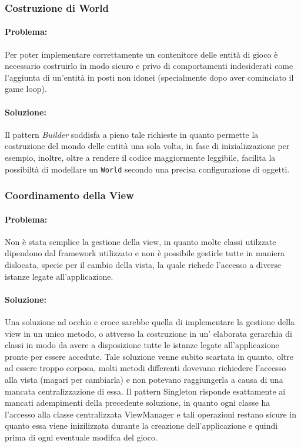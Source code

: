 \documentclass[a4paper,12pt]{report}
\begin{document}
	\subsubsection{Costruzione di World}
	
	\paragraph{Problema:} Per poter implementare correttamente un contenitore delle entità di gioco è necessario costruirlo in modo sicuro e privo di comportamenti indesiderati come l'aggiunta di un'entità in posti non idonei (specialmente dopo aver cominciato il game loop).
	
	\paragraph{Soluzione:} Il pattern \textit{Builder} soddisfa a pieno tale richieste in quanto permette la costruzione del mondo delle entità una sola volta, in fase di inizializzazione per esempio, inoltre, oltre a rendere il codice maggiormente leggibile, facilita la possibiltà di modellare un      \texttt{World} secondo una precisa configurazione di oggetti.
	
	
	\subsubsection{Coordinamento della View}
	
	\paragraph{Problema:} Non è stata semplice la gestione della view, in quanto molte classi utilzzate dipendono dal framework utilizzato e non è possibile gestirle tutte in maniera dislocata, specie per il cambio della vista, la quale richede l'accesso a diverse istanze legate all'applicazione.
	
	\paragraph{Soluzione:} Una soluzione ad occhio e croce sarebbe quella di implementare la gestione della view in un unico metodo, o attverso la costruzione in un' elaborata gerarchia di classi in modo da avere a disposizione tutte le istanze legate all'applicazione pronte per essere accedute. Tale soluzione venne subito scartata in quanto, oltre ad essere troppo corposa, molti metodi differenti dovevano richiedere 
	l'accesso alla vista (magari per cambiarla) e non potevano raggiungerla a causa di una mancata centralizzazione di essa. Il pattern {Singleton} risponde esattamente ai mancati adempimenti della precedente soluzione, in quanto ogni classe ha l'accesso alla classe centralizzata {ViewManager} e tali operazioni restano sicure in quanto essa viene inizilizzata durante la creazione dell'applicazione e quindi prima di ogni eventuale modifca del gioco.
\end{document}
